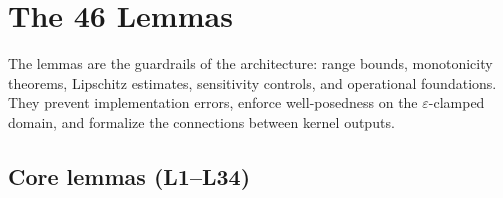 \documentclass[
  aps,
  prd,
  twocolumn,
  superscriptaddress,
  nofootinbib,
  floatfix
]{revtex4-2}
\newcommand{\eps}{\varepsilon}
\begin{document}
\section{The 46 Lemmas}\label{sec:lemmas}

The lemmas are the guardrails of the architecture: range bounds,
monotonicity theorems, Lipschitz estimates, sensitivity controls,
and operational foundations.  They prevent implementation errors,
enforce well-posedness on the $\eps$-clamped domain, and formalize
the connections between kernel outputs.

\subsection{Core lemmas (L1--L34)}
\end{document}
